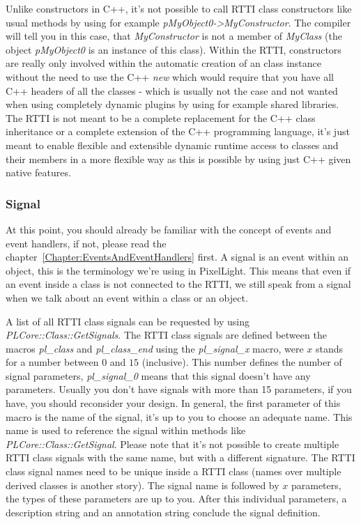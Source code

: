Unlike constructors in C++, it's not possible to call RTTI class constructors like usual methods by using for example \emph{pMyObject0->MyConstructor}. The compiler will tell you in this case, that \emph{MyConstructor} is not a member of \emph{MyClass} (the object \emph{pMyObject0} is an instance of this class). Within the RTTI, constructors are really only involved within the automatic creation of an class instance without the need to use the C++ \emph{new} which would require that you have all C++ headers of all the classes - which is usually not the case and not wanted when using completely dynamic plugins by using for example shared libraries. The RTTI is not meant to be a complete replacement for the C++ class inheritance or a complete extension of the C++ programming language, it's just meant to enable flexible and extensible dynamic runtime access to classes and their members in a more flexible way as this is possible by using just C++ given native features.



\subsubsection{Signal}
At this point, you should already be familiar with the concept of events and event handlers, if not, please read the chapter~\ref{Chapter:EventsAndEventHandlers} first. A signal is an event within an object, this is the terminology we're using in PixelLight. This means that even if an event inside a class is not connected to the RTTI, we still speak from a signal when we talk about an event within a class or an object.

A list of all RTTI class signals can be requested by using \emph{PLCore::Class::GetSignals}. The RTTI class signals are defined between the macros \emph{pl\_class} and \emph{pl\_class\_end} using the \emph{pl\_signal\_x} macro, were $x$ stands for a number between $0$ and $15$ (inclusive). This number defines the number of signal parameters, \emph{pl\_signal\_0} means that this signal doesn't have any parameters. Usually you don't have signals with more than 15 parameters, if you have, you should reconsider your design. In general, the first parameter of this macro is the name of the signal, it's up to you to choose an adequate name. This name is used to reference the signal within methods like \emph{PLCore::Class::GetSignal}. Please note that it's not possible to create multiple RTTI class signals with the same name, but with a different signature. The RTTI class signal names need to be unique inside a RTTI class (names over multiple derived classes is another story). The signal name is followed by $x$ parameters, the types of these parameters are up to you. After this individual parameters, a description string and an annotation string conclude the signal definition.


